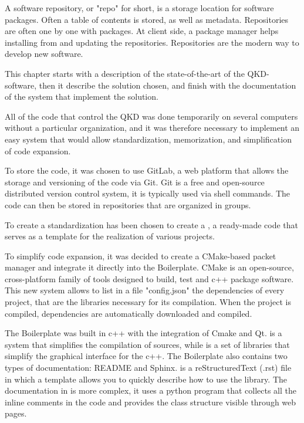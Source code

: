 A software repository, or "repo" for short, is a storage location for software packages. Often a table of contents is stored, as well as metadata. Repositories are often one by one with packages. At client side, a package manager helps installing from and updating the repositories. Repositories are the modern way to develop new software.

This chapter starts with a description of the state-of-the-art of the QKD-software, then it describe the solution chosen, and finish with the documentation of the system that implement the solution.

\newpage

All of the code that control the QKD was done temporarily on several computers without a particular organization, and it was therefore necessary to implement an easy system that would allow standardization, memorization, and simplification of code expansion.

To store the code, it was chosen to use GitLab, a web platform that allows the storage and versioning of the code via Git. Git is a free and open-source distributed version control system, it is typically used via shell commands.
The code can then be stored in repositories that are organized in groups.

To create a standardization has been chosen to create a , a ready-made code that serves as a template for the realization of various projects.

To simplify code expansion, it was decided to create a CMake-based packet manager and integrate it directly into the Boilerplate. CMake is an open-source, cross-platform family of tools designed to build, test and c++ package software.
This new system allows to list in a file "config.json" the dependencies of every project, that are the libraries necessary for its compilation.
When the project is compiled, dependencies are automatically downloaded and compiled.

The Boilerplate was built in c++ with the integration of Cmake and Qt.
 is a system that simplifies the compilation of sources, while  is a set of libraries that simplify the graphical interface for the c++. The Boilerplate also contains two types of documentation: README and Sphinx.
 is a reStructuredText (.rst) file in which a template allows you to quickly describe how to use the library.
The documentation in  is more complex, it uses a python program that collects all the inline comments in the code and provides the class structure visible through web pages.

